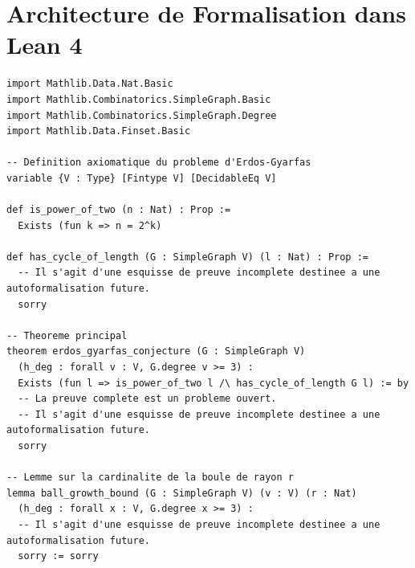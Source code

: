 \documentclass[11pt,a4paper]{article}
\theoremstyle{definition}
\begin{document}
\section{Architecture de Formalisation dans Lean 4}
\begin{verbatim}
import Mathlib.Data.Nat.Basic
import Mathlib.Combinatorics.SimpleGraph.Basic
import Mathlib.Combinatorics.SimpleGraph.Degree
import Mathlib.Data.Finset.Basic

-- Definition axiomatique du probleme d'Erdos-Gyarfas
variable {V : Type} [Fintype V] [DecidableEq V]

def is_power_of_two (n : Nat) : Prop :=
  Exists (fun k => n = 2^k)

def has_cycle_of_length (G : SimpleGraph V) (l : Nat) : Prop :=
  -- Il s'agit d'une esquisse de preuve incomplete destinee a une autoformalisation future.
  sorry

-- Theoreme principal
theorem erdos_gyarfas_conjecture (G : SimpleGraph V)
  (h_deg : forall v : V, G.degree v >= 3) :
  Exists (fun l => is_power_of_two l /\ has_cycle_of_length G l) := by
  -- La preuve complete est un probleme ouvert.
  -- Il s'agit d'une esquisse de preuve incomplete destinee a une autoformalisation future.
  sorry

-- Lemme sur la cardinalite de la boule de rayon r
lemma ball_growth_bound (G : SimpleGraph V) (v : V) (r : Nat)
  (h_deg : forall x : V, G.degree x >= 3) :
  -- Il s'agit d'une esquisse de preuve incomplete destinee a une autoformalisation future.
  sorry := sorry
\end{verbatim}
\end{document}
